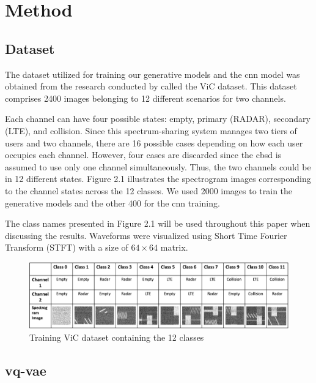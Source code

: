 \chapter{Method}
\label{chap:methods}

\section{Dataset}

The dataset utilized for training our generative models and the \gls{cnn} model was obtained from the research conducted by \cite{5} called the ViC dataset. This dataset comprises 2400 images belonging to 12 different scenarios for two channels. 

Each channel can have four possible states: empty, primary (RADAR), secondary (LTE), and collision. Since this spectrum-sharing system manages two tiers of users and two channels, there are 16 possible cases depending on how each user occupies each channel. However, four cases are discarded since the  \gls{cbsd} is assumed to use only one channel simultaneously. Thus, the two channels could be in 12 different states. Figure 2.1 illustrates the spectrogram images corresponding to the channel states across the 12 classes. We used 2000 images to train the generative models and the other 400 for the \gls{cnn} training. 

The class names presented in Figure 2.1 will be used throughout this paper when discussing the results. Waveforms were visualized using  Short Time Fourier Transform (STFT) with a size of $64 \times 64 $ matrix.

\begin{figure}[h]
\includegraphics[width=\textwidth]{figures/classes_white_background.png}
\centering
\caption{Training ViC dataset containing the 12 classes \cite{5}}
\label{fig:training-dataset}
\centering
\end{figure}
\section{\gls{vq-vae}}

